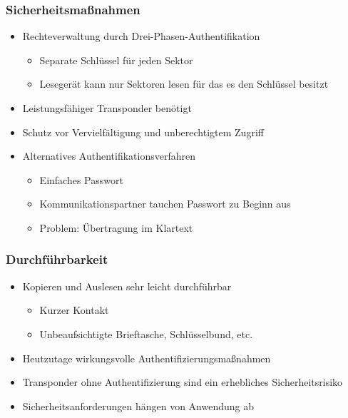 \documentclass{beamer}
\begin{document}
\begin{frame}
\frametitle{Sicherheitsmaßnahmen}

\begin{itemize}
	\item Rechteverwaltung durch Drei-Phasen-Authentifikation
	\begin{itemize}
		\item Separate Schlüssel für jeden Sektor
		\item Lesegerät kann nur Sektoren lesen für das es den Schlüssel besitzt
	\end{itemize}
	\item Leistungsfähiger Transponder benötigt
	\item Schutz vor Vervielfältigung und unberechtigtem Zugriff
	
	\item Alternatives Authentifikationsverfahren
	\begin{itemize}
		\item Einfaches Passwort
		\item Kommunikationspartner tauchen Passwort zu Beginn aus
		\item Problem: Übertragung im Klartext
	\end{itemize}
\end{itemize}
\end{frame}


\begin{frame}
\frametitle{Durchführbarkeit}

\begin{itemize}
	\item Kopieren und Auslesen sehr leicht durchführbar
	\begin{itemize}
		\item Kurzer Kontakt
		\item Unbeaufsichtigte Brieftasche, Schlüsselbund, etc.
	\end{itemize}
	\item Heutzutage wirkungsvolle Authentifizierungsmaßnahmen
	\item Transponder ohne Authentifizierung sind ein erhebliches Sicherheitsrisiko
	\item Sicherheitsanforderungen hängen von Anwendung ab
\end{itemize}
\end{frame}
\end{document}

